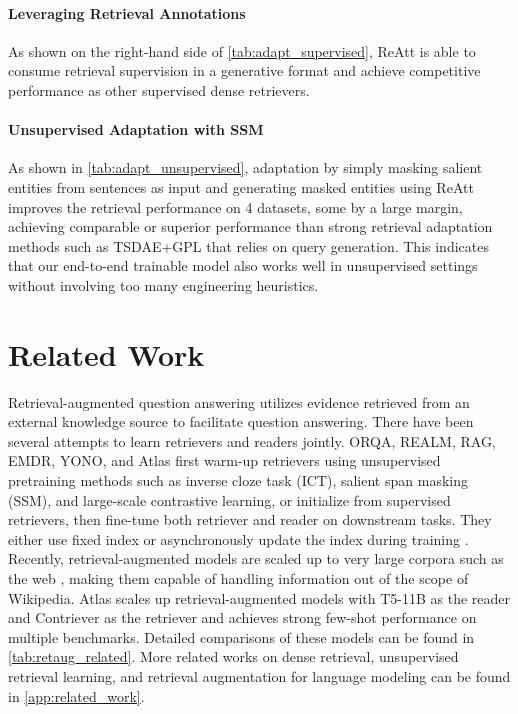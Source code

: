 \documentclass[11pt, dvipsnames]{article}
\newcommand{\ours}{ReAtt\xspace}
\begin{document}
\paragraph{Leveraging Retrieval Annotations}
As shown on the right-hand side of \autoref{tab:adapt_supervised}, \ours is able to consume retrieval supervision in a generative format and achieve competitive performance as other supervised dense retrievers.

\paragraph{Unsupervised Adaptation with SSM}
As shown in \autoref{tab:adapt_unsupervised}, adaptation by simply masking salient entities from sentences as input and generating masked entities using \ours improves the retrieval performance on 4 datasets, some by a large margin, achieving comparable or superior performance than strong retrieval adaptation methods such as TSDAE+GPL that relies on query generation.
This indicates that our end-to-end trainable model also works well in unsupervised settings without involving too many engineering heuristics.

\section{Related Work}\label{sec:related_work}
Retrieval-augmented question answering utilizes evidence retrieved from an external knowledge source to facilitate question answering.
There have been several attempts to learn retrievers and readers jointly.
ORQA, REALM, RAG, EMDR, YONO, and Atlas \cite{orqa-2019-lee,realm-2020-guu,emdr2-2021-sachan,yono-2021-lee,atlas-2022-izacard} first warm-up retrievers using unsupervised pretraining methods such as inverse cloze task (ICT), salient span masking (SSM), and large-scale contrastive learning, or initialize from supervised retrievers, then fine-tune both retriever and reader on downstream tasks.
They either use fixed index \cite{orqa-2019-lee,rag-2020-lewis} or asynchronously update the index during training \cite{realm-2020-guu,emdr2-2021-sachan,yono-2021-lee,atlas-2022-izacard}.
Recently, retrieval-augmented models are scaled up to very large corpora such as the web \cite{oyster-2021-piktus,retro-2021-retro}, making them capable of handling information out of the scope of Wikipedia.
Atlas \cite{atlas-2022-izacard} scales up retrieval-augmented models with T5-11B as the reader and Contriever \cite{contriver-2021-izacard} as the retriever and achieves strong few-shot performance on multiple benchmarks.
Detailed comparisons of these models can be found in \autoref{tab:retaug_related}.
More related works on dense retrieval, unsupervised retrieval learning, and retrieval augmentation for language modeling can be found in \autoref{app:related_work}.
\end{document}
